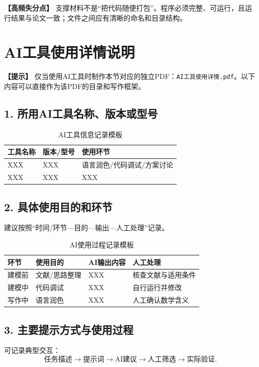 \documentclass[12pt,a4paper]{article}
\newcommand{\tip}[1]{\par\noindent\textbf{【提示】} #1\par}
\newcommand{\warning}[1]{\par\noindent\textbf{【高频失分点】} #1\par}
\begin{document}
\warning{支撑材料不是“把代码随便打包”。程序必须完整、可运行，且运行结果与论文一致；文件之间应有清晰的命名和目录结构。}

\section{AI工具使用详情说明}

\tip{仅当使用AI工具时制作本节对应的独立PDF：\texttt{AI工具使用详情.pdf}。以下内容可以直接作为该PDF的目录和写作框架。}

\subsection*{1. 所用AI工具名称、版本或型号}
\begin{table}[H]
\centering
\caption{AI工具信息记录模板}
\begin{tabular}{p{2cm}p{2cm}p{7cm}}
\toprule
工具名称 & 版本/型号 & 使用环节 \\
\midrule
XXX & XXX & 语言润色/代码调试/方案讨论 \\
XXX & XXX & XXX \\
\bottomrule
\end{tabular}
\end{table}

\subsection*{2. 具体使用目的和环节}
建议按照“时间/环节—目的—输出—人工处理”记录。

\begin{table}[H]
\centering
\caption{AI使用过程记录模板}
\begin{tabular}{p{2.2cm}p{3.5cm}p{3cm}p{5cm}}
\toprule
环节 & 使用目的 & AI输出内容 & 人工处理 \\
\midrule
建模前 & 文献/思路整理 & XXX & 核查文献与适用条件 \\
建模中 & 代码调试 & XXX & 自行运行并修改 \\
写作中 & 语言润色 & XXX & 人工确认数学含义 \\
\bottomrule
\end{tabular}
\end{table}

\subsection*{3. 主要提示方式与使用过程}
可记录典型交互：
\[
\text{任务描述}\rightarrow\text{提示词}\rightarrow\text{AI建议}\rightarrow\text{人工筛选}\rightarrow\text{实际验证}.
\]
\end{document}
